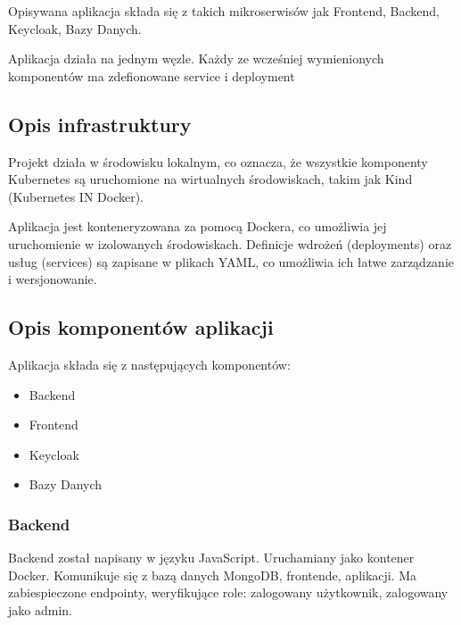 \documentclass[12pt,a4paper]{article}
\begin{document}
Opisywana aplikacja składa się z takich mikroserwisów jak Frontend, Backend, Keycloak, Bazy Danych.

Aplikacja działa na jednym węzle. Każdy ze wcześniej wymienionych komponentów ma zdefionowane service i deployment


\subsection{Opis infrastruktury}
\label{sec:Users}


Projekt działa w środowisku lokalnym, co oznacza, że wszystkie komponenty Kubernetes są uruchomione na wirtualnych środowiskach, takim jak Kind (Kubernetes IN Docker). 

Aplikacja jest konteneryzowana za pomocą Dockera, co umożliwia jej uruchomienie w izolowanych środowiskach. Definicje wdrożeń (deployments) oraz usług (services) są zapisane w plikach YAML, co umożliwia ich łatwe zarządzanie i wersjonowanie.

\subsection{Opis komponentów aplikacji}
\label{sec:FunctionalConditions}


Aplikacja składa się z następujących komponentów:

\begin{itemize}
    \item Backend
    \item Frontend
    \item Keycloak
    \item Bazy Danych
\end{itemize}


\subsubsection{Backend}

Backend został napisany w języku JavaScript. Uruchamiany jako kontener Docker. Komunikuje się z bazą danych MongoDB, frontende, aplikacji. Ma zabiespieczone endpointy, weryfikujące role: zalogowany użytkownik, zalogowany jako admin.
\end{document}
